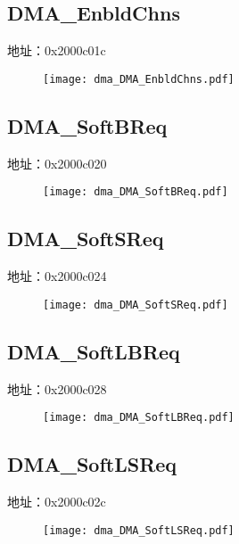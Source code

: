 \subsection{DMA\_EnbldChns}
\label{dma-DMA-EnbldChns}
地址：0x2000c01c
 \begin{figure}[H]
\texttt{[image: dma\_DMA\_EnbldChns.pdf]}
\end{figure}

\subsection{DMA\_SoftBReq}
\label{dma-DMA-SoftBReq}
地址：0x2000c020
 \begin{figure}[H]
\texttt{[image: dma\_DMA\_SoftBReq.pdf]}
\end{figure}

\subsection{DMA\_SoftSReq}
\label{dma-DMA-SoftSReq}
地址：0x2000c024
 \begin{figure}[H]
\texttt{[image: dma\_DMA\_SoftSReq.pdf]}
\end{figure}

\subsection{DMA\_SoftLBReq}
\label{dma-DMA-SoftLBReq}
地址：0x2000c028
 \begin{figure}[H]
\texttt{[image: dma\_DMA\_SoftLBReq.pdf]}
\end{figure}

\subsection{DMA\_SoftLSReq}
\label{dma-DMA-SoftLSReq}
地址：0x2000c02c
 \begin{figure}[H]
\texttt{[image: dma\_DMA\_SoftLSReq.pdf]}
\end{figure}

